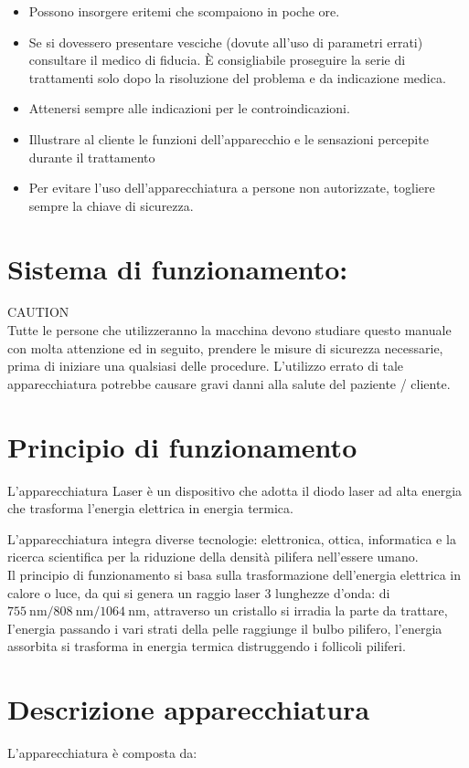 \documentclass[10pt]{article}
\begin{document}
\begin{itemize}
  \item Possono insorgere eritemi che scompaiono in poche ore.
  \item Se si dovessero presentare vesciche (dovute all'uso di parametri errati) consultare il medico di fiducia. È consigliabile proseguire la serie di trattamenti solo dopo la risoluzione del problema e da indicazione medica.
  \item Attenersi sempre alle indicazioni per le controindicazioni.
  \item Illustrare al cliente le funzioni dell'apparecchio e le sensazioni percepite durante il trattamento
  \item Per evitare l'uso dell'apparecchiatura a persone non autorizzate, togliere sempre la chiave di sicurezza.
\end{itemize}

\section{Sistema di funzionamento:}
CAUTION\\
Tutte le persone che utilizzeranno la macchina devono studiare questo manuale con molta attenzione ed in seguito, prendere le misure di sicurezza necessarie, prima di iniziare una qualsiasi delle procedure. L'utilizzo errato di tale apparecchiatura potrebbe causare gravi danni alla salute del paziente / cliente.

\section{Principio di funzionamento}
L'apparecchiatura Laser è un dispositivo che adotta il diodo laser ad alta energia che trasforma l'energia elettrica in energia termica.

L'apparecchiatura integra diverse tecnologie: elettronica, ottica, informatica e la ricerca scientifica per la riduzione della densità pilifera nell'essere umano.\\
Il principio di funzionamento si basa sulla trasformazione dell'energia elettrica in calore o luce, da qui si genera un raggio laser 3 lunghezze d'onda: di $755 \mathrm{~nm} / 808 \mathrm{~nm} / 1064 \mathrm{~nm}$, attraverso un cristallo si irradia la parte da trattare, I’energia passando i vari strati della pelle raggiunge il bulbo pilifero, l'energia assorbita si trasforma in energia termica distruggendo i follicoli piliferi.

\section{Descrizione apparecchiatura}
L'apparecchiatura è composta da:
\end{document}
